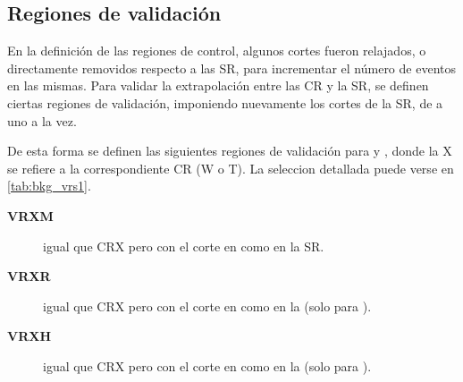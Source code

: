 \subsection{Regiones de validación}

En la definición de las regiones de control, algunos cortes fueron relajados, o directamente removidos
respecto a las SR, para incrementar el número de eventos en las mismas. Para validar la extrapolación
entre las CR y la SR, se definen ciertas regiones de validación, imponiendo nuevamente los cortes de la SR, de
a uno a la vez.

De esta forma se definen las siguientes regiones de validación para {\CRW} y {\CRT}, donde la X se refiere a
la correspondiente CR (W o T). La seleccion detallada puede verse en \cref{tab:bkg_vrs1}.

\begin{description}
\item[\textbf{VRXM}] igual que CRX pero con el corte en {\met} como en la SR.
\item[\textbf{VRXR}]  igual que CRX pero con el corte en {\rt} como en la {\SRL} (solo para {\SRL}).
\item[\textbf{VRXH}]  igual que CRX pero con el corte en {\HT} como en la {\SRH} (solo para {\SRH}).
\end{description}

